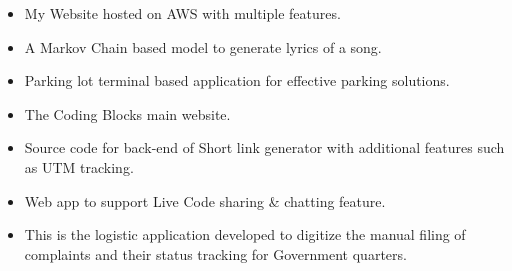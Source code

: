 
\begin{itemize}
\item My Website hosted on AWS with multiple features.
\end{itemize}


\begin{itemize}
\item A Markov Chain based model to generate lyrics of a song. 
\end{itemize}

\begin{itemize}
\item Parking lot terminal based application for effective parking solutions.
\end{itemize}

\begin{itemize}
\item The Coding Blocks main website.
\end{itemize}

\begin{itemize}
\item Source code for back-end of Short link generator with additional features such as UTM tracking.
\end{itemize}

\begin{itemize}
\item Web app to support Live Code sharing \& chatting feature.
\end{itemize}


\begin{itemize}
\item This is the logistic application developed to digitize the manual filing of complaints and their status tracking for Government quarters.
\end{itemize}

